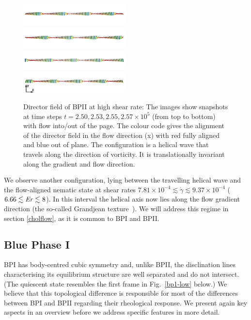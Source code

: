 \documentclass[8.5pt,twoside,twocolumn]{article}
\newcommand{\e}[1]{\times10^{#1}}
\newcommand{\gd}{\dot{\gamma}}
\begin{document}
\begin{figure}[htpb]
\includegraphics[width=0.495\textwidth]{dir+y-250k_run949.png}
\includegraphics[width=0.495\textwidth]{dir+y-253k_run949.png}
\includegraphics[width=0.495\textwidth]{dir+y-255k_run949.png}
\includegraphics[width=0.495\textwidth]{dir+y-257k_run949.png}
\caption{Director field of BPII at high shear rate: The images show snapshots at time steps 
$t=2.50, 2.53,2.55, 2.57\e{5}$ (from top to bottom) with flow into/out of the page. The colour code gives the alignment of the director field in the flow direction (x) with red fully aligned and blue out of plane. 
The configuration is a helical wave that travels along the direction of vorticity.
It is translationally invariant along the gradient and flow direction.}
\label{bp2-high}
\end{figure}

We observe another configuration, lying between the travelling helical wave 
and the  flow-aligned nematic state at shear rates 
$7.81\e{-4}\lesssim\gd\lesssim9.37\e{-4}$ ($6.66\lesssim {\it Er} \lesssim 8$). In this interval
the helical axis now lies along the flow gradient direction (the so-called
Grandjean texture~\cite{deGennes}).
We will address this regime in section \ref{cholflow}, as it is common to BPI and BPII.

\subsection{Blue Phase I}

BPI has body-centred cubic symmetry and, unlike BPII, the disclination lines
characterising its equilibrium structure are well separated and do not 
intersect. (The quiescent state resembles the first frame in Fig.~\ref{bp1-low}
below.)
We believe that this topological difference is responsible for most of
the differences between BPI and BPII regarding their rheological response. 
We present again key aspects in an overview before we address specific features 
in more detail. 
\end{document}
